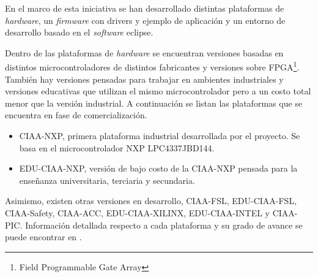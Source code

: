 En el marco de esta iniciativa se han desarrollado distintas plataformas de \textit{hardware}, un \textit{firmware} con drivers y ejemplo de aplicación y un entorno de desarrollo basado en el \textit{software} eclipse.

Dentro de las plataformas de \textit{hardware} se encuentran versiones basadas en distintos microcontroladores de distintos fabricantes y versiones sobre FPGA\footnote{Field Programmable Gate Array}.  También hay versiones pensadas para trabajar en ambientes industriales y versiones educativas que utilizan el mismo microcontrolador pero a un costo total menor que la versión industrial. 
A continuación se listan las plataformas que se encuentra en fase de comercialización.

\begin{itemize}
\item CIAA-NXP, primera plataforma industrial desarrollada por el proyecto.  Se basa en el microcontrolador NXP LPC4337JBD144. 
\item EDU-CIAA-NXP, versión de bajo costo de la CIAA-NXP pensada para la enseñanza universitaria, terciaria y secundaria. 
\end{itemize}

Asimismo, existen otras versiones en desarrollo, CIAA-FSL, EDU-CIAA-FSL, CIAA-Safety, CIAA-ACC, EDU-CIAA-XILINX, EDU-CIAA-INTEL y CIAA-PIC. Información detallada respecto a cada plataforma y su grado de avance se puede encontrar en \citep{CIAA}.


